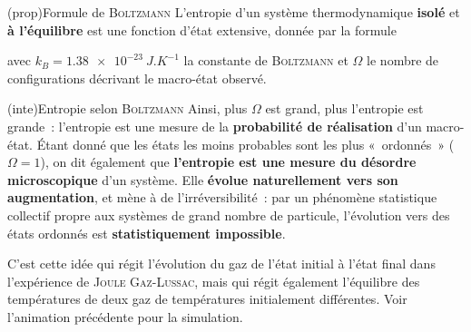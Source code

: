 \documentclass[../../main/main.tex]{subfiles}
\begin{document}
\begin{tcb*}(prop){Formule de \textsc{Boltzmann}}
	L'entropie d'un système thermodynamique \textbf{isolé} et \textbf{à
		l'équilibre} est une fonction d'état extensive, donnée par la formule
	\smallbreak
	\begin{isd}
		\psw{%
			\[
				\boxed{S = k_B \ln \Omega}
			\]
		}%
		\vspace{-15pt}
		\tcblower
		\psw{%
			\[
				\si{J.K^{-1}}
			\]
		}%
		\vspace{-15pt}
	\end{isd}
	avec $k_B = \SI{1.38e-23}{J.K^{-1}}$ la constante de \textsc{Boltzmann} et
	$\Omega$ le nombre de configurations décrivant le macro-état observé.
\end{tcb*}
\begin{tcb*}(inte){Entropie selon \textsc{Boltzmann}}
	Ainsi, plus $\Omega$ est grand, plus l'entropie est grande~: l'entropie est
	une mesure de la \textbf{probabilité de réalisation} d'un macro-état. Étant
	donné que les états les moins probables sont les plus «~ordonnés~» ($\Omega =
		1$), on dit également que \textbf{l'entropie est une mesure du désordre
		microscopique} d'un système.
	\bigbreak
	Elle \textbf{évolue naturellement vers son augmentation}, et mène à de
	l'irréversibilité~: par un phénomène statistique collectif propre aux systèmes
	de grand nombre de particule, l'évolution vers des états ordonnés est
	\textbf{statistiquement impossible}.
\end{tcb*}

C'est cette idée qui régit l'évolution du gaz de l'état initial à l'état final
dans l'expérience de \textsc{Joule Gaz-Lussac}, mais qui régit également
l'équilibre des températures de deux gaz de températures initialement
différentes. Voir l'animation précédente pour la simulation.
\end{document}

